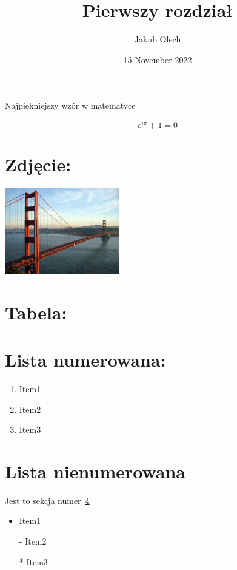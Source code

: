 \documentclass{article}
\title{Pierwszy rozdział}
\author{Jakub Olech}
\date{15 November 2022}
\begin{document}
\maketitle
\begin{center}
Najpiękniejszy wzór w matematyce
\end{center}
\[ e^{i\pi} + 1 = 0 \]

\section{Zdjęcie:}

\includegraphics[width=5cm]{pictures/GoldenGateBridge.jpg}

\section{Tabela:}



\section{Lista numerowana:}
\label{sec:lista}
\begin{enumerate}
    \item Item1
    \item Item2
    \item Item3
\end{enumerate}

\par

\section{Lista nienumerowana}
\label{sec:lista}
Jest to sekcja numer~\ref{sec:lista}
\begin{itemize}
    \item Item1
    \item[-] Item2
    \item[*] Item3
\end{itemize}
\end{document}
